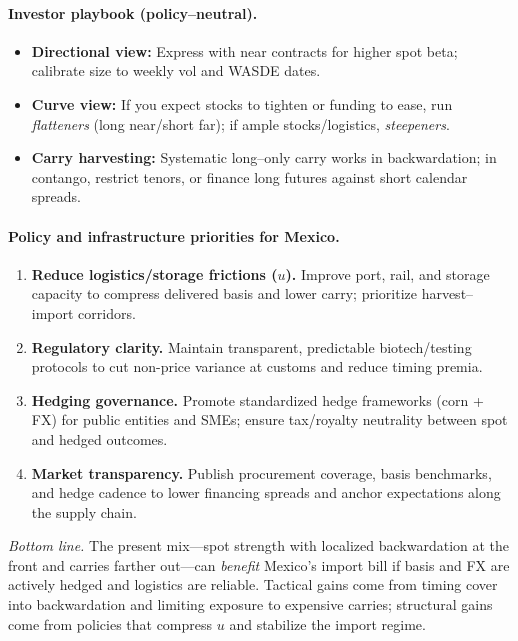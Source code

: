 \documentclass[10pt,a4paper]{article} %
\begin{document}
\paragraph{Investor playbook (policy–neutral).}
\begin{itemize}
  \item \textbf{Directional view:} Express with near contracts for higher spot beta; calibrate size to weekly vol and WASDE dates.
  \item \textbf{Curve view:} If you expect stocks to tighten or funding to ease, run \emph{flatteners} (long near/short far); if ample stocks/logistics, \emph{steepeners}.
  \item \textbf{Carry harvesting:} Systematic long–only carry works in backwardation; in contango, restrict tenors, or finance long futures against short calendar spreads.
\end{itemize}

\paragraph{Policy and infrastructure priorities for Mexico.}
\begin{enumerate}
  \item \textbf{Reduce logistics/storage frictions (\(u\)).} Improve port, rail, and storage capacity to compress delivered basis and lower carry; prioritize harvest–import corridors.
  \item \textbf{Regulatory clarity.} Maintain transparent, predictable biotech/testing protocols to cut non-price variance at customs and reduce timing premia.
  \item \textbf{Hedging governance.} Promote standardized hedge frameworks (corn + FX) for public entities and SMEs; ensure tax/royalty neutrality between spot and hedged outcomes.
  \item \textbf{Market transparency.} Publish procurement coverage, basis benchmarks, and hedge cadence to lower financing spreads and anchor expectations along the supply chain.
\end{enumerate}

\noindent\emph{Bottom line.} The present mix—spot strength with localized backwardation at the front and carries farther out—can \emph{benefit} Mexico’s import bill if basis and FX are actively hedged and logistics are reliable. Tactical gains come from timing cover into backwardation and limiting exposure to expensive carries; structural gains come from policies that compress \(u\) and stabilize the import regime.
\end{document}

